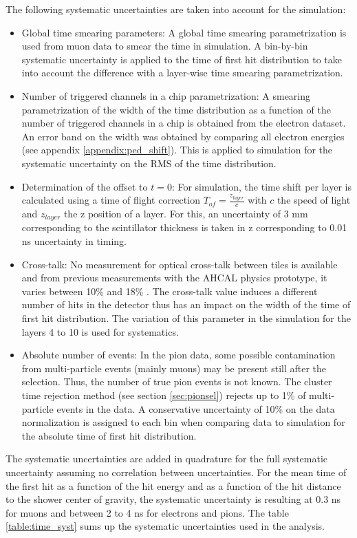 The following systematic uncertainties are taken into account for the simulation:

\begin{itemize}
	\item Global time smearing parameters: A global time smearing parametrization is used from muon data to smear the time in simulation. A bin-by-bin systematic uncertainty is applied to the time of first hit distribution to take into account the difference with a layer-wise time smearing parametrization.
	\item Number of triggered channels in a chip parametrization: A smearing parametrization of the width of the time distribution as a function of the number of triggered channels in a chip is obtained from the electron dataset. An error band on the width was obtained by comparing all electron energies (see appendix \ref{appendix:ped_shift}). This is applied to simulation for the systematic uncertainty on the RMS of the time distribution.
	\item Determination of the offset to $t=0$: For simulation, the time shift per layer is calculated using a time of flight correction $T_{of} = \frac{z_{layer}}{c}$ with $c$ the speed of light and $z_{layer}$ the z position of a layer. For this, an uncertainty of 3 mm corresponding to the scintillator thickness is taken in z corresponding to 0.01 ns uncertainty in timing.
	\item Cross-talk: No measurement for optical cross-talk between tiles is available and from previous measurements with the AHCAL physics prototype, it varies between 10\% and 18\% \cite{Gunter:2015ika}. The cross-talk value induces a different number of hits in the detector thus has an impact on the width of the time of first hit distribution. The variation of this parameter in the simulation for the layers 4 to 10 is used for systematics.
	\item Absolute number of events: In the pion data, some possible contamination from multi-particle events (mainly muons) may be present still after the selection. Thus, the number of true pion events is not known. The cluster time rejection method (see section \ref{sec:pionsel}) rejects up to 1\% of multi-particle events in the data. A conservative uncertainty of 10\% on the data normalization is assigned to each bin when comparing data to simulation for the absolute time of first hit distribution.
\end{itemize}

The systematic uncertainties are added in quadrature for the full systematic uncertainty assuming no correlation between uncertainties. For the mean time of the first hit as a function of the hit energy and as a function of the hit distance to the shower center of gravity, the systematic uncertainty is resulting at 0.3 ns for muons and between 2 to 4 ns for electrons and pions. The table \ref{table:time_syst} sums up the systematic uncertainties used in the analysis.

